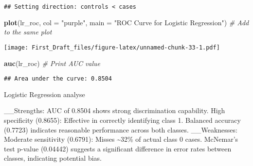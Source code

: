 \documentclass[
]{article}
\newenvironment{Shaded}{\begin{snugshade}}{\end{snugshade}}
\newcommand{\AttributeTok}[1]{\textcolor[rgb]{0.13,0.29,0.53}{#1}}
\newcommand{\CommentTok}[1]{\textcolor[rgb]{0.56,0.35,0.01}{\textit{#1}}}
\newcommand{\FunctionTok}[1]{\textcolor[rgb]{0.13,0.29,0.53}{\textbf{#1}}}
\newcommand{\NormalTok}[1]{#1}
\newcommand{\StringTok}[1]{\textcolor[rgb]{0.31,0.60,0.02}{#1}}
\begin{document}
\begin{verbatim}
## Setting direction: controls < cases
\end{verbatim}

\begin{Shaded}
\begin{Highlighting}[]
\FunctionTok{plot}\NormalTok{(lr\_roc, }\AttributeTok{col =} \StringTok{"purple"}\NormalTok{, }\AttributeTok{main =} \StringTok{"ROC Curve for Logistic Regression"}\NormalTok{)  }\CommentTok{\# Add to the same plot}
\end{Highlighting}
\end{Shaded}

\texttt{[image: First\_Draft\_files/figure-latex/unnamed-chunk-33-1.pdf]}

\begin{Shaded}
\begin{Highlighting}[]
\FunctionTok{auc}\NormalTok{(lr\_roc)  }\CommentTok{\# Print AUC value}
\end{Highlighting}
\end{Shaded}

\begin{verbatim}
## Area under the curve: 0.8504
\end{verbatim}

Logistic Regression analyse

\_\_Strengths: AUC of 0.8504 shows strong discrimination capability.
High specificity (0.8655): Effective in correctly identifying class 1.
Balanced accuracy (0.7723) indicates reasonable performance across both
classes. \_\_Weaknesses: Moderate sensitivity (0.6791): Misses
\textasciitilde32\% of actual class 0 cases. McNemar's test p-value
(0.04442) suggests a significant difference in error rates between
classes, indicating potential bias.
\end{document}
